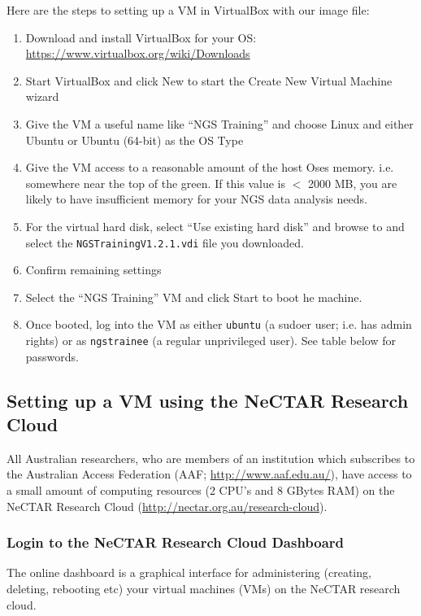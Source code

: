 Here are the steps to setting up a VM in VirtualBox with our image file:
\begin{enumerate}
  \item Download and install VirtualBox for your OS: 
  \url{https://www.virtualbox.org/wiki/Downloads}
  \item Start VirtualBox and click New to start the Create New Virtual Machine wizard
  \item Give the VM a useful name like ``NGS Training'' and choose Linux and
  either Ubuntu or Ubuntu (64-bit) as the OS Type
  \item Give the VM access to a reasonable amount of the host Oses memory. i.e.
  somewhere near the top of the green. If this value is $<$ 2000 MB, you are
  likely to have insufficient memory for your NGS data analysis needs.
  \item For the virtual hard disk, select ``Use existing hard disk'' and browse
  to and select the \texttt{NGSTrainingV1.2.1.vdi} file you downloaded.
  \item Confirm remaining settings
  \item Select the ``NGS Training'' VM and click Start to boot he machine.
  \item Once booted, log into the VM as either \texttt{ubuntu} (a sudoer user;
  i.e. has admin rights) or as \texttt{ngstrainee} (a regular unprivileged
  user). See table below for passwords.
\end{enumerate}


\subsection{Setting up a VM using the NeCTAR Research Cloud}
All Australian researchers, who are members of an institution which subscribes
to the Australian Access Federation (AAF; \url{http://www.aaf.edu.au/}), have
access to a small amount of computing resources (2 CPU's and 8 GBytes RAM) on
the NeCTAR Research Cloud (\url{http://nectar.org.au/research-cloud}).

\subsubsection{Login to the NeCTAR Research Cloud Dashboard}
The online dashboard is a graphical interface for administering (creating,
deleting, rebooting etc) your virtual machines (VMs) on the NeCTAR research
cloud.

